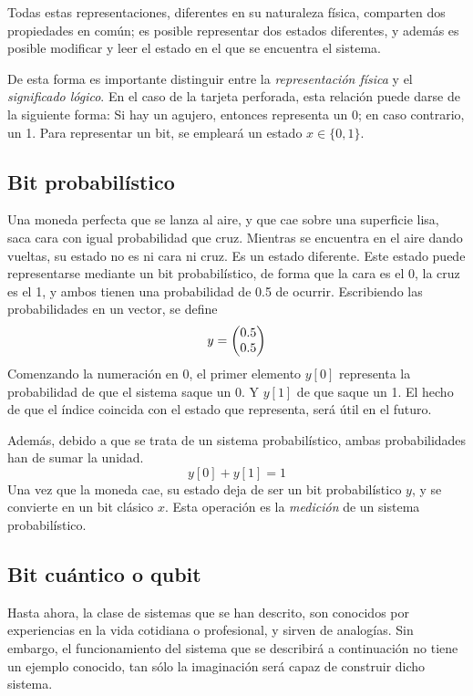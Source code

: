 Todas estas representaciones, diferentes en su naturaleza física, comparten dos 
propiedades en común; es posible representar dos estados diferentes, y además es 
posible modificar y leer el estado en el que se encuentra el sistema.

De esta forma es importante distinguir entre la \textit{representación física} y 
el \textit{significado lógico}. En el caso de la tarjeta perforada, esta 
relación puede darse de la siguiente forma: Si hay un agujero, entonces 
representa un 0; en caso contrario, un 1. Para representar un bit, se empleará 
un estado $x \in \{0, 1\}$.


\subsection{Bit probabilístico}

Una moneda perfecta que se lanza al aire, y que cae sobre una superficie lisa, 
saca cara con igual probabilidad que cruz. Mientras se encuentra en el aire 
dando vueltas, su estado no es ni cara ni cruz. Es un estado diferente. Este 
estado puede representarse mediante un bit probabilístico, de forma que la cara 
es el 0, la cruz es el 1, y ambos tienen una probabilidad de 0.5 de ocurrir.  
Escribiendo las probabilidades en un vector, se define
%
$$ y = \begin{pmatrix} 0.5 \\ 0.5 \end{pmatrix} $$
%
Comenzando la numeración en 0, el primer elemento $y[0]$ representa la 
probabilidad de que el sistema saque un 0. Y $y[1]$ de que saque un 1. El hecho 
de que el índice coincida con el estado que representa, será útil en el futuro.

Además, debido a que se trata de un sistema probabilístico, ambas probabilidades 
han de sumar la unidad.
%
$$ y[0] + y[1] = 1 $$
%
Una vez que la moneda cae, su estado deja de ser un bit probabilístico $y$, y se 
convierte en un bit clásico $x$. Esta operación es la \textit{medición} de un 
sistema probabilístico.

\subsection{Bit cuántico o qubit}

Hasta ahora, la clase de sistemas que se han descrito, son conocidos por 
experiencias en la vida cotidiana o profesional, y sirven de analogías. Sin 
embargo, el funcionamiento del sistema que se describirá a continuación no tiene 
un ejemplo conocido, tan sólo la imaginación será capaz de construir dicho 
sistema.

